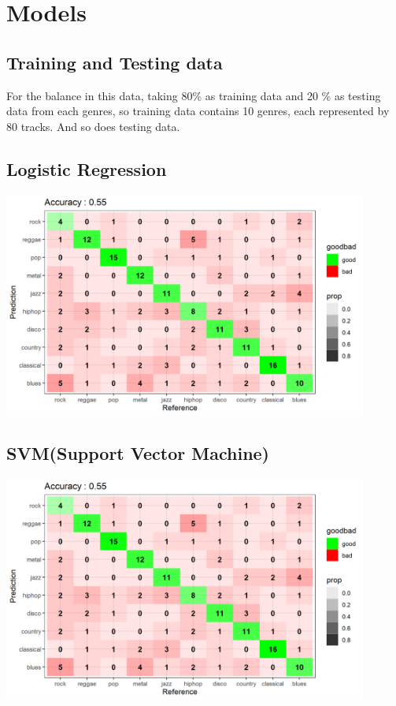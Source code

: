\documentclass[12pt,a4paper]{article}
\begin{document}
\section{Models}
\subsection{Training and Testing data}
For the balance in this data, taking 80\% as training data and 20 \% as testing data from each genres, so training data contains 10 genres, each represented by 80 tracks. And so does testing data.

\subsection{Logistic Regression}
\includegraphics[width=0.9\textwidth]{confusionMatrix_logreg.png}
\newpage
\subsection{SVM(Support Vector Machine)}
\includegraphics[width=0.9\textwidth]{confusionMatrix_logreg.png}
\end{document}

